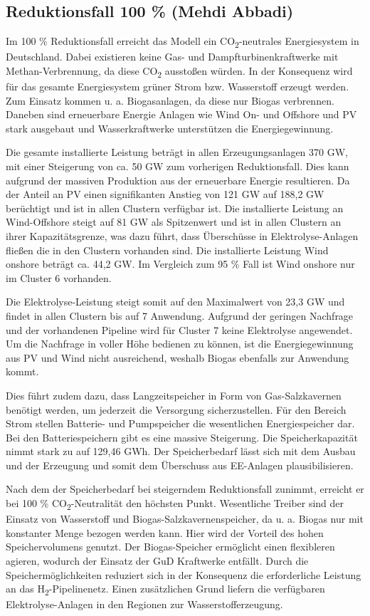 \newpage
\subsection{Reduktionsfall 100 \% (Mehdi Abbadi)}
Im 100 \% Reduktionsfall erreicht das Modell ein CO\textsubscript{2}-neutrales Energiesystem in Deutschland. Dabei existieren keine Gas- und Dampfturbinenkraftwerke mit Methan-Verbrennung, da diese CO\textsubscript{2} ausstoßen würden. In der Konsequenz wird für das gesamte Energiesystem grüner Strom bzw. Wasserstoff erzeugt werden. Zum Einsatz kommen u. a. Biogasanlagen, da diese nur Biogas verbrennen. Daneben sind erneuerbare Energie Anlagen wie Wind On- und Offshore und PV stark ausgebaut und Wasserkraftwerke unterstützen die Energiegewinnung. 

Die gesamte installierte Leistung beträgt in allen Erzeugungsanlagen 370 GW, mit einer Steigerung von ca. 50 GW zum vorherigen Reduktionsfall. Dies kann aufgrund der massiven Produktion aus der erneuerbare Energie resultieren. Da der Anteil an PV einen signifikanten Anstieg von 121 GW auf 188,2 GW berüchtigt und ist in allen Clustern verfügbar ist. Die installierte Leistung an Wind-Offshore steigt auf 81 GW als Spitzenwert und ist in allen Clustern an ihrer Kapazitätsgrenze, was dazu führt, dass Überschüsse in Elektrolyse-Anlagen fließen die in den Clustern vorhanden sind.  Die installierte Leistung Wind onshore beträgt ca. 44,2 GW. Im Vergleich zum 95 \% Fall ist Wind onshore nur im Cluster 6 vorhanden. 

Die Elektrolyse-Leistung steigt somit auf den Maximalwert von 23,3 GW und findet in allen Clustern bis auf 7 Anwendung. Aufgrund der geringen Nachfrage und der vorhandenen Pipeline wird für Cluster 7 keine Elektrolyse angewendet. Um die Nachfrage in voller Höhe bedienen zu können, ist die Energiegewinnung aus PV und Wind nicht ausreichend, weshalb Biogas ebenfalls zur Anwendung kommt. 

Dies führt zudem dazu, dass Langzeitspeicher in Form von Gas-Salzkavernen benötigt werden, um jederzeit die Versorgung sicherzustellen. Für den Bereich Strom stellen Batterie- und Pumpspeicher die wesentlichen Energiespeicher dar. Bei den Batteriespeichern gibt es eine massive Steigerung. Die Speicherkapazität nimmt stark zu auf 129,46 GWh. Der Speicherbedarf lässt sich mit dem Ausbau und der Erzeugung und somit dem Überschuss aus EE-Anlagen plausibilisieren.  

Nach dem der Speicherbedarf bei steigerndem Reduktionsfall zunimmt, erreicht er bei 100 \% CO\textsubscript{2}-Neutralität den höchsten Punkt. Wesentliche Treiber sind der Einsatz von Wasserstoff und Biogas-Salzkavernenspeicher, da u. a. Biogas nur mit konstanter Menge bezogen werden kann. Hier wird der Vorteil des hohen Speichervolumens genutzt. Der Biogas-Speicher ermöglicht einen flexibleren agieren, wodurch der Einsatz der GuD Kraftwerke entfällt. Durch die Speichermöglichkeiten reduziert sich in der Konsequenz die erforderliche Leistung an das H\textsubscript{2}-Pipelinenetz. Einen zusätzlichen Grund liefern die verfügbaren Elektrolyse-Anlagen in den Regionen zur Wasserstofferzeugung.

